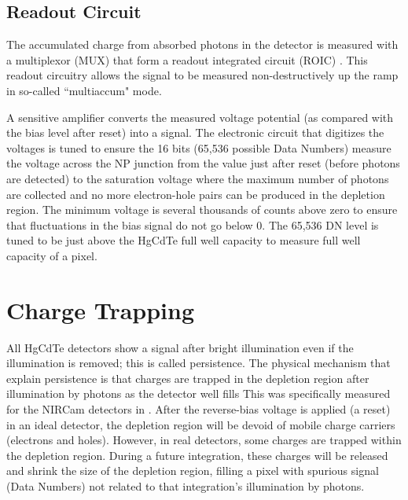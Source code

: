 \documentclass[]{aastex62}
\begin{document}
\subsection{Readout Circuit}\label{sec:readout}

The accumulated charge from absorbed photons in the detector is measured with a multiplexor (MUX) that form a readout integrated circuit (ROIC) \citep{rieke2007irDetectorReview}.
This readout circuitry allows the signal to be measured non-destructively up the ramp in so-called ``multiaccum" mode.

A sensitive amplifier converts the measured voltage potential (as compared with the bias level after reset) into a signal.
The electronic circuit that digitizes the voltages is tuned to ensure the 16 bits (65,536 possible Data Numbers) measure the voltage across the NP junction from the value just after reset (before photons are detected) to the saturation voltage where the maximum number of photons are collected and no more electron-hole pairs can be produced in the depletion region.
The minimum voltage is several thousands of counts above zero to ensure that fluctuations in the bias signal do not go below 0.
The 65,536 DN level is tuned to be just above the HgCdTe full well capacity to measure full well capacity of a pixel.




\section{Charge Trapping}
All HgCdTe detectors show a signal after bright illumination even if the illumination is removed; this is called persistence.
The physical mechanism that explain persistence is that charges are trapped in the depletion region after illumination by photons as the detector well fills \citep{smith2008imgPersistence}
This was specifically measured for the NIRCam detectors in \citet{leisenring2016persistence}.
After the reverse-bias voltage is applied (a reset) in an ideal detector, the depletion region will be devoid of mobile charge carriers (electrons and holes).
However, in real detectors, some charges are trapped within the depletion region.
During a future integration, these charges will be released and shrink the size of the depletion region, filling a pixel with spurious signal (Data Numbers) not related to that integration's illumination by photons.
\end{document}
